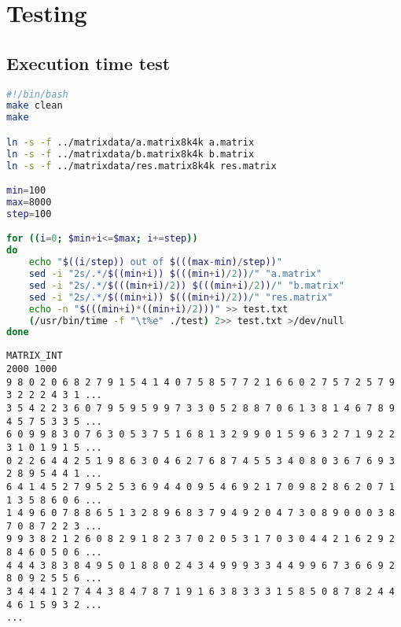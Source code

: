 \chapter{Testing}\label{app:testing}
\section{Execution time test}
\begin{lstlisting}[language=bash,caption={Bash script for automating execution time test},frame=tlrb]
#!/bin/bash
make clean
make

ln -s -f ../matrixdata/a.matrix8k4k a.matrix
ln -s -f ../matrixdata/b.matrix8k4k b.matrix
ln -s -f ../matrixdata/res.matrix8k4k res.matrix

min=100
max=8000
step=100

for ((i=0; $min+i<=$max; i+=step))
do
    echo "$((i/step)) out of $(((max-min)/step))"
    sed -i "2s/.*/$((min+i)) $(((min+i)/2))/" "a.matrix"
    sed -i "2s/.*/$(((min+i)/2)) $(((min+i)/2))/" "b.matrix"
    sed -i "2s/.*/$((min+i)) $(((min+i)/2))/" "res.matrix"
    echo -n "$(((min+i)*((min+i)/2)))" >> test.txt    
    (/usr/bin/time -f "\t%e" ./test) 2>> test.txt >/dev/null
done
\end{lstlisting}

\begin{lstlisting}[caption={Sample of file containing a matrix, some data omitted},frame=tlrb]
MATRIX_INT
2000 1000
9 8 0 2 0 6 8 2 7 9 1 5 4 1 4 0 7 5 8 5 7 7 2 1 6 6 0 2 7 5 7 2 5 7 9 3 2 2 2 4 3 1 ... 
3 5 4 2 2 3 6 0 7 9 5 9 5 9 9 7 3 3 0 5 2 8 8 7 0 6 1 3 8 1 4 6 7 8 9 4 5 7 5 3 3 5 ... 
6 0 9 9 8 3 0 7 6 3 0 5 3 7 5 1 6 8 1 3 2 9 9 0 1 5 9 6 3 2 7 1 9 2 2 3 1 0 1 9 1 5 ...
0 2 2 6 4 4 2 5 1 9 8 6 3 0 4 6 2 7 6 8 7 4 5 5 3 4 0 8 0 3 6 7 6 9 3 2 8 9 5 4 4 1 ...
6 4 1 4 5 2 7 9 5 2 5 3 6 9 4 4 0 9 5 4 6 9 2 1 7 0 9 8 2 8 6 2 0 7 1 1 3 5 8 6 0 6 ...
1 4 9 6 0 7 8 8 6 5 1 3 2 8 9 6 8 3 7 9 4 9 2 0 4 7 3 0 8 9 0 0 0 3 8 7 0 8 7 2 2 3 ...
9 9 3 8 2 1 2 6 0 8 2 9 1 8 2 3 7 0 2 0 5 3 1 7 0 3 0 4 4 2 1 6 2 9 2 8 4 6 0 5 0 6 ...
4 4 4 3 8 3 8 4 9 5 0 1 8 8 0 2 4 3 4 9 9 9 3 3 4 4 9 9 6 7 3 6 6 9 2 8 0 9 2 5 5 6 ...
3 4 4 4 1 2 7 4 4 3 8 4 7 8 7 1 9 1 6 3 8 3 3 3 1 5 8 5 0 8 7 8 2 4 4 4 6 1 5 9 3 2 ...
...
\end{lstlisting}

